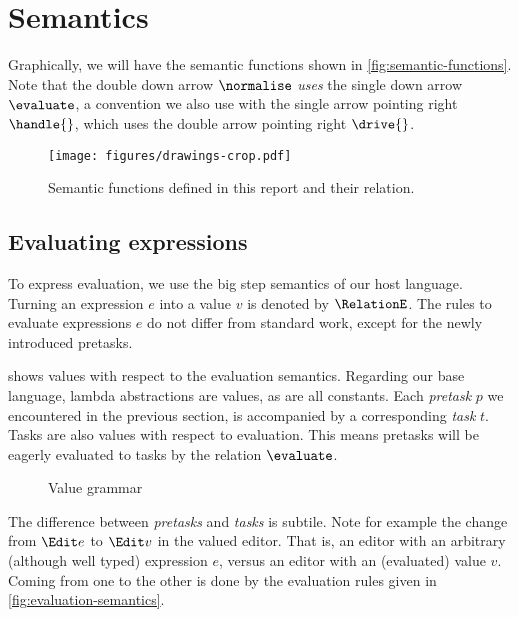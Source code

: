 
\section{Semantics}


Graphically,
we will have the semantic functions shown in \autoref{fig:semantic-functions}.
Note that the double down arrow $\normalise$ \emph{uses} the single down arrow $\evaluate$,
a convention we also use with the single arrow pointing right $\handle{}$,
which uses the double arrow pointing right $\drive{}$.

\begin{figure}[h]
  \centering
  \texttt{[image: figures/drawings-crop.pdf]}
  \caption{
    Semantic functions defined in this report and their relation.
  }
  \label{fig:semantic-functions}
\end{figure}



\subsection{Evaluating expressions}
\label{sec:evaluation}

To express evaluation,
we use the big step semantics of our host language.
Turning an expression $e$ into a value $v$ is denoted by $\RelationE$.
The rules to evaluate expressions $e$ do not differ from standard work,
except for the newly introduced pretasks.

 shows values with respect to the evaluation semantics.
Regarding our base language, lambda abstractions are values, as are all constants.
Each \emph{pretask} $p$ we encountered in the previous section,
is accompanied by a corresponding \emph{task} $t$.
Tasks are also values with respect to evaluation.
This means pretasks will be eagerly evaluated to tasks by the relation $\evaluate$.

\begin{figure}[h]
  \small
  \caption{Value grammar} \label{fig:value-grammar}
\end{figure}

The difference between \emph{pretasks} and \emph{tasks} is subtile.
Note for example the change from $\Edit e$ to $\Edit v$ in the valued editor.
That is, an editor with an arbitrary (although well typed) expression $e$,
versus an editor with an (evaluated) value $v$.
Coming from one to the other is done by the evaluation rules given in \autoref{fig:evaluation-semantics}.

